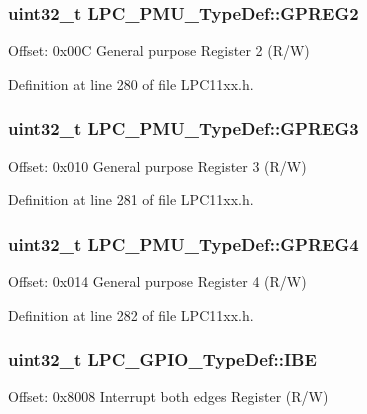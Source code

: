 \subsubsection[{\texorpdfstring{G\+P\+R\+E\+G2}{GPREG2}}]{ uint32\+\_\+t L\+P\+C\+\_\+\+P\+M\+U\+\_\+\+Type\+Def\+::\+G\+P\+R\+E\+G2}\hypertarget{group___l_p_c11xx___definitions_ga56d0d66c3216217926792c465ba59557}{}\label{group___l_p_c11xx___definitions_ga56d0d66c3216217926792c465ba59557}
Offset\+: 0x00C General purpose Register 2 (R/W) 

Definition at line 280 of file L\+P\+C11xx.\+h.

\subsubsection[{\texorpdfstring{G\+P\+R\+E\+G3}{GPREG3}}]{ uint32\+\_\+t L\+P\+C\+\_\+\+P\+M\+U\+\_\+\+Type\+Def\+::\+G\+P\+R\+E\+G3}\hypertarget{group___l_p_c11xx___definitions_ga8206f79423746cfc3789c0a039139e02}{}\label{group___l_p_c11xx___definitions_ga8206f79423746cfc3789c0a039139e02}
Offset\+: 0x010 General purpose Register 3 (R/W) 

Definition at line 281 of file L\+P\+C11xx.\+h.

\subsubsection[{\texorpdfstring{G\+P\+R\+E\+G4}{GPREG4}}]{ uint32\+\_\+t L\+P\+C\+\_\+\+P\+M\+U\+\_\+\+Type\+Def\+::\+G\+P\+R\+E\+G4}\hypertarget{group___l_p_c11xx___definitions_ga1232f5a7193adf2f2e5b1fd6ec943889}{}\label{group___l_p_c11xx___definitions_ga1232f5a7193adf2f2e5b1fd6ec943889}
Offset\+: 0x014 General purpose Register 4 (R/W) 

Definition at line 282 of file L\+P\+C11xx.\+h.

\subsubsection[{\texorpdfstring{I\+BE}{IBE}}]{ uint32\+\_\+t L\+P\+C\+\_\+\+G\+P\+I\+O\+\_\+\+Type\+Def\+::\+I\+BE}\hypertarget{group___l_p_c11xx___definitions_gad60ed0e9e99e717d85add279d88cff1d}{}\label{group___l_p_c11xx___definitions_gad60ed0e9e99e717d85add279d88cff1d}
Offset\+: 0x8008 Interrupt both edges Register (R/W) 

